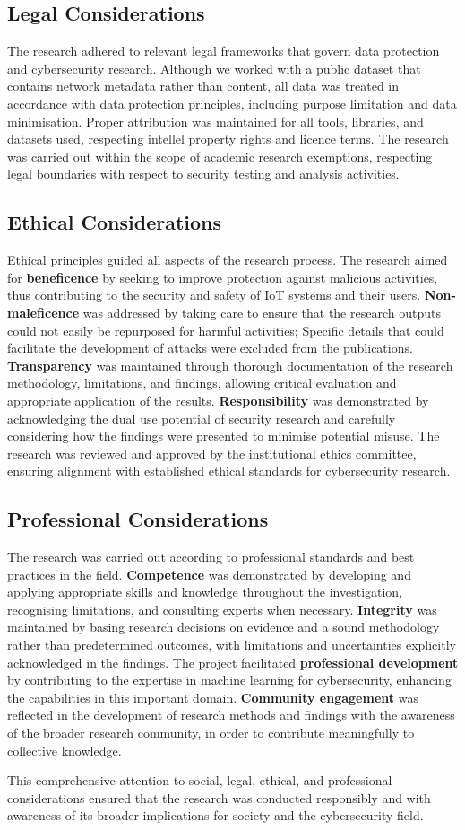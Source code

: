 \subsection{Legal Considerations}

The research adhered to relevant legal frameworks that govern data protection and cybersecurity research. Although we worked with a public dataset that contains network metadata rather than content, all data was treated in accordance with data protection principles, including purpose limitation and data minimisation. Proper attribution was maintained for all tools, libraries, and datasets used, respecting intellel property rights and licence terms. The research was carried out within the scope of academic research exemptions, respecting legal boundaries with respect to security testing and analysis activities.

\subsection{Ethical Considerations}

Ethical principles guided all aspects of the research process. The research aimed for \textbf{beneficence} by seeking to improve protection against malicious activities, thus contributing to the security and safety of IoT systems and their users. \textbf{Non-maleficence} was addressed by taking care to ensure that the research outputs could not easily be repurposed for harmful activities; Specific details that could facilitate the development of attacks were excluded from the publications. \textbf{Transparency} was maintained through thorough documentation of the research methodology, limitations, and findings, allowing critical evaluation and appropriate application of the results. \textbf{Responsibility} was demonstrated by acknowledging the dual use potential of security research and carefully considering how the findings were presented to minimise potential misuse. The research was reviewed and approved by the institutional ethics committee, ensuring alignment with established ethical standards for cybersecurity research.

\subsection{Professional Considerations}

The research was carried out according to professional standards and best practices in the field. \textbf{Competence} was demonstrated by developing and applying appropriate skills and knowledge throughout the investigation, recognising limitations, and consulting experts when necessary. \textbf{Integrity} was maintained by basing research decisions on evidence and a sound methodology rather than predetermined outcomes, with limitations and uncertainties explicitly acknowledged in the findings. The project facilitated \textbf{professional development} by contributing to the expertise in machine learning for cybersecurity, enhancing the capabilities in this important domain. \textbf{Community engagement} was reflected in the development of research methods and findings with the awareness of the broader research community, in order to contribute meaningfully to collective knowledge.

This comprehensive attention to social, legal, ethical, and professional considerations ensured that the research was conducted responsibly and with awareness of its broader implications for society and the cybersecurity field.
